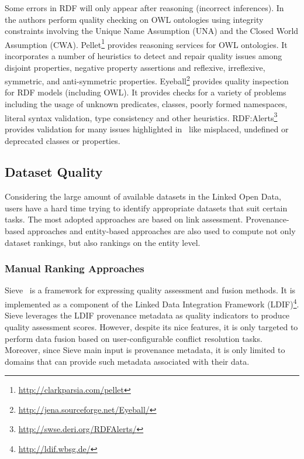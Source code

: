 \documentclass[onecolumn, crcready]{../../Tools/LaTEX/iosart2c}
\begin{document}
Some errors in RDF will only appear after reasoning (incorrect inferences). In~\cite{Sirin:OWLED:08,Tao:HICSS:09} the authors perform quality checking on OWL ontologies using integrity constraints involving the Unique Name Assumption (UNA) and the Closed World Assumption (CWA). Pellet\footnote{\url{http://clarkparsia.com/pellet}} provides reasoning services for OWL ontologies. It incorporates a number of heuristics to detect and repair quality issues among disjoint properties, negative property assertions and reflexive, irreflexive, symmetric, and anti-symmetric properties. Eyeball\footnote{\url{http://jena.sourceforge.net/Eyeball/}} provides quality inspection for RDF models (including OWL). It provides checks for a variety of problems including the usage of unknown predicates, classes, poorly formed namespaces, literal syntax validation, type consistency and other heuristics. RDF:Alerts\footnote{\url{http://swse.deri.org/RDFAlerts/}} provides validation for many issues highlighted in~\cite{Hogan:LDOW:10} like misplaced, undefined or deprecated classes or properties.

\subsection{Dataset Quality}
Considering the large amount of available datasets in the Linked Open Data, users have a hard time trying to identify appropriate datasets that suit certain tasks. The most adopted approaches are based on link assessment. Provenance-based approaches and entity-based approaches are also used to compute not only dataset rankings, but also rankings on the entity level.

\subsubsection{Manual Ranking Approaches}

Sieve~\cite{Mendes:EDBT:12} is a framework for expressing quality assessment and fusion methods. It is implemented as a component of the Linked Data Integration Framework (LDIF)\footnote{\url{http://ldif.wbsg.de/}}. Sieve leverages the LDIF provenance metadata as quality indicators to produce quality assessment scores. However, despite its nice features, it is only targeted to perform data fusion based on user-configurable conflict resolution tasks. Moreover, since Sieve main input is provenance metadata, it is only limited to domains that can provide such metadata associated with their data.
\end{document}
